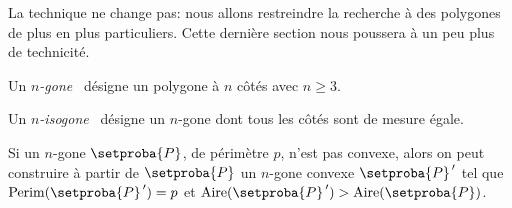 La technique ne change pas: nous allons restreindre la recherche à des polygones de plus en plus particuliers. Cette dernière section nous poussera à un peu plus de technicité.




\begin{defi}
	Un \og \emph{$n$-gone} \fg\ désigne un polygone à $n$ côtés avec $n \geq 3$.
\end{defi}


\begin{defi}
	Un \og \emph{$n$-isogone} \fg\ désigne un $n$-gone dont tous les côtés sont de mesure égale.
\end{defi}




\begin{fact} \label{conv-poly}
	Si un $n$-gone $\setproba{P}$, de périmètre $p$, n'est pas convexe, alors on peut construire à partir de $\setproba{P}$ un $n$-gone convexe $\setproba{P}^{\,\prime}$ tel que $\perim{\setproba{P}^{\,\prime}} = p$ et $\area{\setproba{P}^{\,\prime}} > \area{\setproba{P}}$.
\end{fact}


